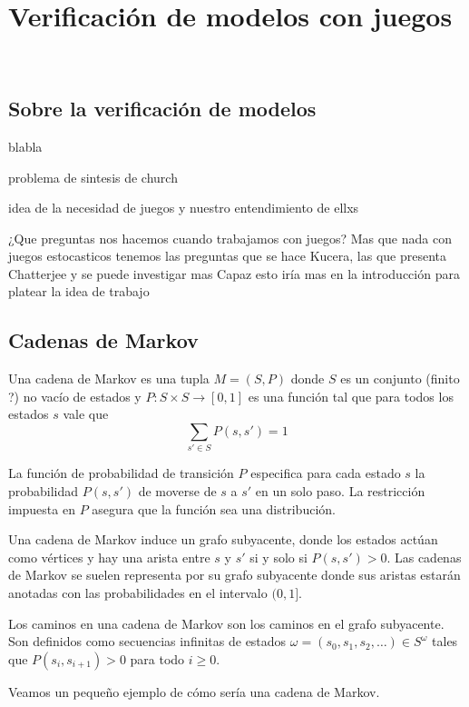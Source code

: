 \chapter{Verificación de modelos con juegos}
~\label{cap:modelos}

\section{Sobre la verificación de modelos}

blabla

problema de sintesis de church

idea de la necesidad de juegos y nuestro entendimiento de ellxs

¿Que preguntas nos hacemos cuando trabajamos con juegos? Mas que nada con juegos estocasticos
tenemos las preguntas que se hace Kucera, las que presenta Chatterjee y se puede investigar mas
Capaz esto iría mas en la introducción para platear la idea de trabajo

\section{Cadenas de Markov}

\begin{definition}
	Una cadena de Markov es una tupla $M = (S, P)$ donde $S$ es un conjunto (finito ?) no vacío de estados y $P: S \times S \rightarrow [0,1]$ es una función tal que para todos los estados $s$ vale que
	$$ \sum_{s' \in S} P(s, s') = 1$$
\end{definition}

La función de probabilidad de transición $P$ especifica para cada estado $s$ la
probabilidad $P(s, s')$ de moverse de $s$ a $s'$ en un solo paso. La
restricción impuesta en $P$ asegura que la función sea una distribución.

Una cadena de Markov induce un grafo subyacente, donde los estados actúan como
vértices y hay una arista entre $s$ y $s'$ si y solo si $P(s, s') > 0$. Las
cadenas de Markov se suelen representa por su grafo subyacente donde sus
aristas estarán anotadas con las probabilidades en el intervalo $(0, 1]$.

Los caminos en una cadena de Markov son los caminos en el grafo subyacente. Son
definidos como secuencias infinitas de estados $\omega = (s_0, s_1, s_2, \dots)
	\in S^\omega$ tales que $P(s_i, s_{i+1}) > 0 $ para todo $i \geq 0$.

Veamos un pequeño ejemplo de cómo sería una cadena de Markov.

